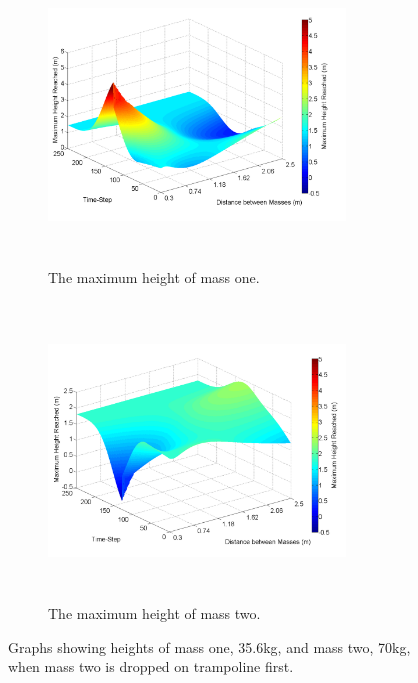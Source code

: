 \begin{figure}[H]
	\centering
    \begin{subfigure}{0.45\textwidth}
		\includegraphics[width=3.1in, height=3.1in]{m2_on_tramp_different_masses_m1.png}
    	\caption{The maximum height of mass one.}\label{fig:m2m1}
    \end{subfigure}\hfill
	\begin{subfigure}{0.45\textwidth}
		\includegraphics[width=3.1in, height=3.1in]{m2_on_tramp_different_masses_m2.png}
    	\caption{The maximum height of mass two.}\label{fig:m2m2}
    \end{subfigure}\hfill
    \caption{Graphs showing heights of mass one, 35.6kg, and mass two, 70kg, when mass two is dropped on trampoline first.}\label{fig:m2on3d}
\end{figure}

